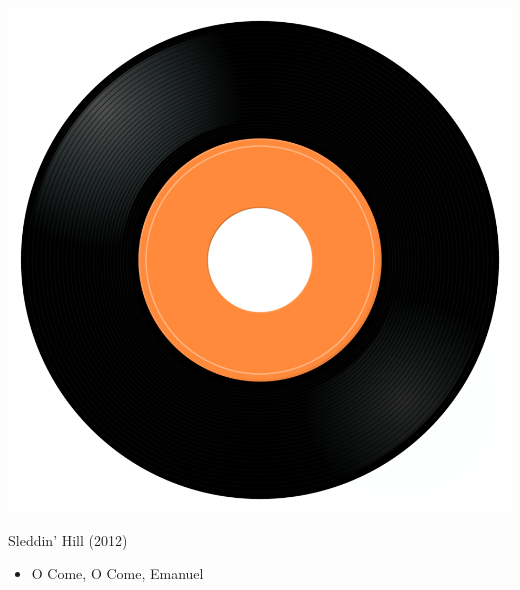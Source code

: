 \begin{minipage}[t]{0.25\textwidth}\vspace{0pt}
\captionsetup{type=figure}
\includegraphics[width=\textwidth]{Images/cover.png}
\caption*{Sleddin' Hill (2012)}
\end{minipage}
\begin{minipage}[t]{0.25\textwidth}\vspace{0pt}
\begin{itemize}[nosep,leftmargin=1em,labelwidth=*,align=left]
	\setlength{\itemsep}{0pt}
	\item O Come, O Come, Emanuel 
\end{itemize}
\end{minipage}
